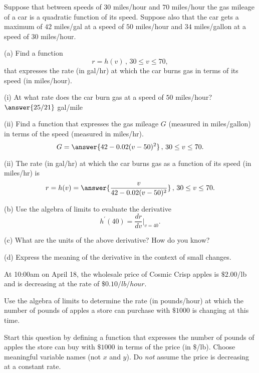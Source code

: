 \documentclass{ximera}
\begin{document}
\begin{question}  \label{Q:ewrtggg}
Suppose that between speeds of $30$ miles/hour and $70$ miles/hour the gas mileage of a car is a quadratic function of its speed. 
Suppose also that the car gets a maximum of $42$ miles/gal at a speed of $50$ miles/hour and $34$ miles/gallon at a speed of $30$ miles/hour.

(a) Find a function
\[
    r = h(v) \, , \, 30\leq v \leq 70 ,
\]
that expresses the rate (in gal/hr) at which the car burns gas in terms of its speed (in miles/hour).
\begin{hint}

(i) At what rate does the car burn gas at a speed of $50$ miles/hour? $\answer{25/21}$ gal/mile

(ii) Find a function that expresses the gas mileage $G$ (measured in miles/gallon) in terms of the speed (measured in miles/hr).
\[
         G = \answer{42 - 0.02(v-50)^2} \, , \, 30\leq v \leq 70 .
\]

(ii) The rate (in gal/hr) at which the car burns gas as a function of its speed (in miles/hr) is
\[
         r = h(v) = \answer{\frac{v}{42 - 0.02(v-50)^2}} \, , \, 30\leq v \leq 70  .
\]
\end{hint}

(b) Use the algebra of limits to evaluate the derivative
\[
    h^\prime(40) = \frac{dr}{dv}\Big|_{v=40} .
\]

(c) What are the units of the above derivative? How do you know?

(d) Express the meaning of the derivative in the context of small changes.

\end{question}


\begin{question}  \label{Qersadefgt4}
At 10:00am on April 18, the wholesale price of Cosmic Crisp apples is $\$2.00$/lb and is decreasing at the rate of $\$0.10/lb/hour$. 

Use the algebra of limits to determine the rate (in pounds/hour) at which the number of pounds of apples a store 
can purchase with $\$1000$ is changing at this time.

Start this question by defining a function that expresses the number of pounds of apples the store can buy with $\$1000$ in terms of the price (in $\$$/lb). Choose meaningful variable names (not $x$ and $y$). Do \emph{not} assume the price is decreasing at a constant rate.
\end{question}
\end{document}
